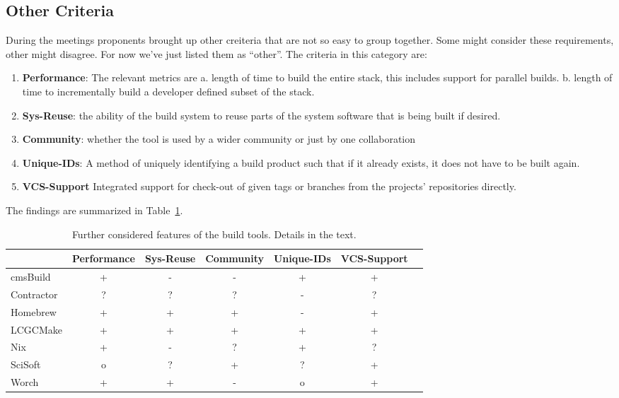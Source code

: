 \documentclass[12pt,a4paper]{article}
\begin{document}
\subsection{Other Criteria}
During the meetings proponents brought up other creiteria that are not so easy to group together.  Some might consider these requirements, other might disagree. For now we've just listed them as ``other''. The criteria in this category are:
\begin{enumerate}
\item \textbf{Performance}: The relevant metrics are a. length of time to build the entire stack, this includes support for parallel builds. b. length of time to incrementally build a developer defined subset of the stack. 
\item \textbf{Sys-Reuse}: the ability of the build system to reuse parts of the system software that is being built if desired.
\item \textbf{Community}: whether the tool is used by a wider community or just by one collaboration 
\item \textbf{Unique-IDs}: A method of uniquely identifying a build product such that if it already exists, it does not have to be built again. 
  \item \textbf{VCS-Support} Integrated support for check-out of given tags or branches from the projects’ repositories directly.
\end{enumerate}
The findings are summarized in Table~\ref{tab:taxonomyOthers}. 
\begin{table}
\centering
\begin{tabular}{lcccccc}

&Performance & Sys-Reuse & Community & Unique-IDs & VCS-Support\\ \hline
cmsBuild & \cellcolor{green} + & \cellcolor{red} - & \cellcolor{red} - & \cellcolor{green} +& \cellcolor{green} +  \\
Contractor & ? & ?  & ? & \cellcolor{red} - & ?\\
Homebrew & \cellcolor{green} +  & \cellcolor{green} +  & \cellcolor{green} + & \cellcolor{red} - & \cellcolor{green} + \\
LCGCMake & \cellcolor{green} + & \cellcolor{green} + & \cellcolor{green} + & \cellcolor{green} + & \cellcolor{green} + \\
Nix & \cellcolor{green} + & \cellcolor{red} -  & ? & \cellcolor{green} + & ? \\
SciSoft & \cellcolor{yellow} o & ? & \cellcolor{green} + & ? & \cellcolor{green}+  \\
Worch & \cellcolor{green} + &  \cellcolor{green} + & \cellcolor{red} -  & \cellcolor{yellow} o & \cellcolor{green} + 
\end{tabular}
\caption{\label{tab:taxonomyOthers}Further considered features of the build tools. Details in the text.}
\end{table}
\end{document}
